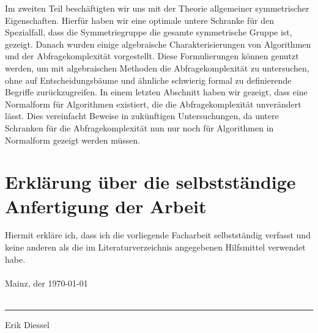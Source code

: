 \documentclass[10pt,a4paper, footheight=1mm]{scrreprt}
\theoremstyle{definition}
\begin{document}
Im zweiten Teil beschäftigten wir uns mit der
Theorie allgemeiner symmetrischer Eigenschaften.
Hierfür haben wir eine optimale untere Schranke für
den Spezialfall, dass die Symmetriegruppe die gesamte
symmetrische Gruppe ist, gezeigt. Danach wurden
einige algebraische Charakterisierungen von Algorithmen
und der Abfragekomplexität vorgestellt. Diese Formulierungen
können genutzt werden, um mit algebraischen Methoden
die Abfragekomplexität zu untersuchen, ohne auf 
Entscheidungsbäume und ähnliche schwierig formal zu 
definierende Begriffe zurückzugreifen. In einem letzten
Abschnitt haben wir gezeigt, dass eine Normalform
für Algorithmen existiert, die die Abfragekomplexität
unverändert lässt. Dies vereinfacht Beweise
in zukünftigen Untersuchungen, da untere Schranken
für die Abfragekomplexität nun nur noch für Algorithmen
in Normalform gezeigt werden müssen.

\printbibliography[title={\ Literatur}]

\chapter*{Erklärung über die selbstständige Anfertigung der Arbeit}

Hiermit erkläre ich, dass ich die vorliegende Facharbeit
selbstständig verfasst und keine anderen als die im Literaturverzeichnis
angegebenen Hilfsmittel verwendet habe. \\ \\

Mainz, der \today \\ \\

\rule{7cm}{0.4mm}
\vspace*{0.2cm}

Erik Diessel
\end{document}
